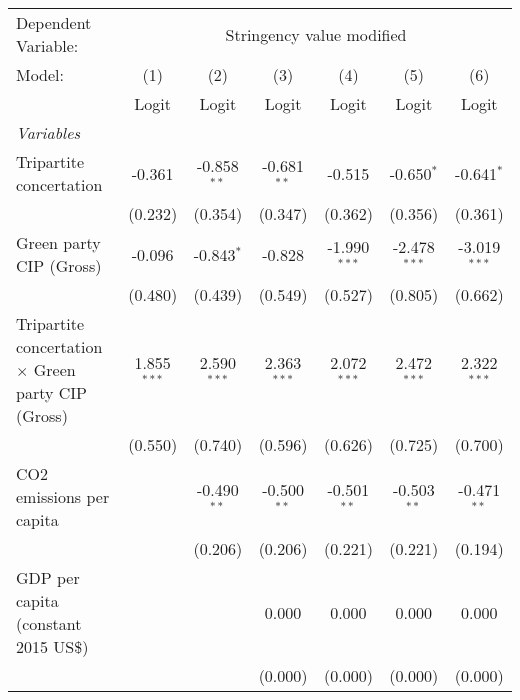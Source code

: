 
\begingroup
\centering
\begin{tabular}{lcccccc}
   \toprule
   Dependent Variable: & \multicolumn{6}{c}{Stringency value modified}\\
   Model:                                                    & (1)           & (2)           & (3)           & (4)            & (5)            & (6)\\  
                                                             &  Logit        & Logit         & Logit         & Logit          & Logit          & Logit\\  
   \midrule
   \emph{Variables}\\
   Tripartite concertation                                   & -0.361        & -0.858$^{**}$ & -0.681$^{**}$ & -0.515         & -0.650$^{*}$   & -0.641$^{*}$\\   
                                                             & (0.232)       & (0.354)       & (0.347)       & (0.362)        & (0.356)        & (0.361)\\   
   Green party CIP (Gross)                                   & -0.096        & -0.843$^{*}$  & -0.828        & -1.990$^{***}$ & -2.478$^{***}$ & -3.019$^{***}$\\   
                                                             & (0.480)       & (0.439)       & (0.549)       & (0.527)        & (0.805)        & (0.662)\\   
   Tripartite concertation $\times$ Green party CIP (Gross)  & 1.855$^{***}$ & 2.590$^{***}$ & 2.363$^{***}$ & 2.072$^{***}$  & 2.472$^{***}$  & 2.322$^{***}$\\   
                                                             & (0.550)       & (0.740)       & (0.596)       & (0.626)        & (0.725)        & (0.700)\\   
   CO2 emissions per capita                                  &               & -0.490$^{**}$ & -0.500$^{**}$ & -0.501$^{**}$  & -0.503$^{**}$  & -0.471$^{**}$\\   
                                                             &               & (0.206)       & (0.206)       & (0.221)        & (0.221)        & (0.194)\\   
   GDP per capita (constant 2015 US\$)                       &               &               & 0.000         & 0.000          & 0.000          & 0.000\\   
                                                             &               &               & (0.000)       & (0.000)        & (0.000)        & (0.000)\\   

\end{tabular}
